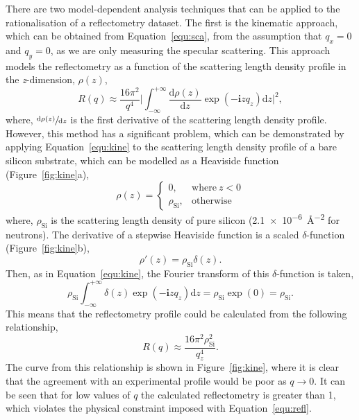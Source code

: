 There are two model-dependent analysis techniques that can be applied to the rationalisation of a reflectometry dataset.
The first is the kinematic approach, which can be obtained from Equation~\ref{equ:sca}, from the assumption that $q_x = 0$ and $q_y = 0$, as we are only measuring the specular scattering.
This approach models the reflectometry as a function of the scattering length density profile in the \emph{z}-dimension, $\rho(z)$,
%
\begin{equation}
    R(q) \approx \frac{16\pi^2}{q^4}\bigg|\int_{-\infty}^{+\infty}\frac{\text{d}\rho(z)}{\text{d}z}\exp{(-\mathbf{i}zq_z)}\text{d}z\bigg|^2,
    \label{equ:kine}
\end{equation}
%
where, $\sfrac{\text{d}\rho(z)}{\text{d}z}$ is the first derivative of the scattering length density profile.
However, this method has a significant problem, which can be demonstrated by applying Equation~\ref{equ:kine} to the scattering length density profile of a bare silicon substrate, which can be modelled as a Heaviside function (Figure~\ref{fig:kine}a),
%
\begin{equation}
    \rho(z) =
  \begin{cases}
    0, & \text{where}\ z < 0 \\
    \rho_{\text{Si}}, & \text{otherwise}
  \end{cases}
\end{equation}
%
where, $\rho_{\text{Si}}$ is the scattering length density of pure silicon (\SI{2.1e-6}{\angstrom^{-2}} for neutrons).
The derivative of a stepwise Heaviside function is a scaled $\delta$-function (Figure~\ref{fig:kine}b),
%
\begin{equation}
    \rho'(z) = \rho_{\text{Si}}\delta(z).
\end{equation}
%
Then, as in Equation~\ref{equ:kine}, the Fourier transform of this $\delta$-function is taken,
%
\begin{equation}
    \rho_{\text{Si}}\int_{-\infty}^{+\infty}\delta(z)\exp{(-\mathbf{i}zq_z)}\text{d}z = \rho_{\text{Si}}\exp(0) = \rho_{\text{Si}}.
\end{equation}
%
This means that the reflectometry profile could be calculated from the following relationship,
%
\begin{equation}
    R(q)\approx \frac{16\pi^2\rho_{\text{Si}}^2}{q_z^4}.
\end{equation}
%
The curve from this relationship is shown in Figure~\ref{fig:kine}, where it is clear that the agreement with an experimental profile would be poor as $q \rightarrow 0$.
It can be seen that for low values of $q$ the calculated reflectometry is greater than 1, which violates the physical constraint imposed with Equation~\ref{equ:refl}.
